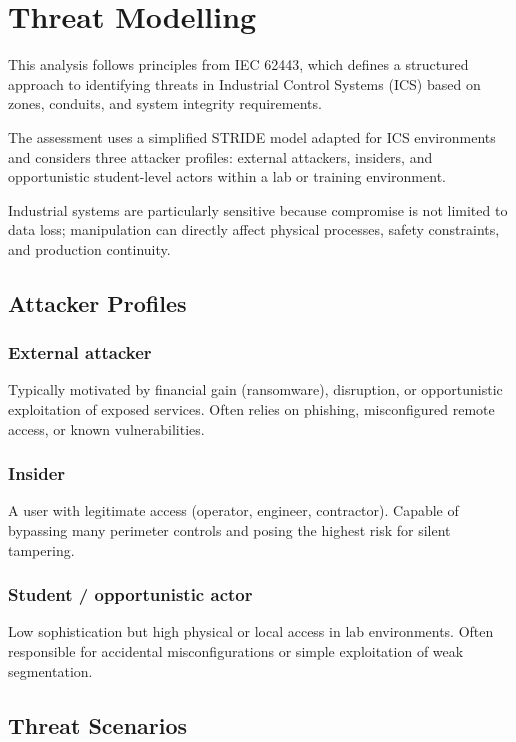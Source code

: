 \section{Threat Modelling}

This analysis follows principles from IEC 62443, which defines a structured approach to identifying threats in Industrial Control Systems (ICS) based on zones, conduits, and system integrity requirements.

The assessment uses a simplified STRIDE model adapted for ICS environments and considers three attacker profiles: external attackers, insiders, and opportunistic student-level actors within a lab or training environment.

Industrial systems are particularly sensitive because compromise is not limited to data loss; manipulation can directly affect physical processes, safety constraints, and production continuity.

\subsection{Attacker Profiles}

\subsubsection*{External attacker}
Typically motivated by financial gain (ransomware), disruption, or opportunistic exploitation of exposed services. Often relies on phishing, misconfigured remote access, or known vulnerabilities.

\subsubsection*{Insider}
A user with legitimate access (operator, engineer, contractor). Capable of bypassing many perimeter controls and posing the highest risk for silent tampering.

\subsubsection*{Student / opportunistic actor}
Low sophistication but high physical or local access in lab environments. Often responsible for accidental misconfigurations or simple exploitation of weak segmentation.

\subsection{Threat Scenarios}

